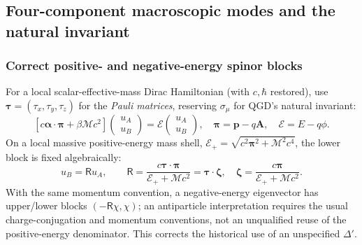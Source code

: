 \documentclass[11pt,a4paper]{article}
\begin{document}
\subsection{Four-component macroscopic modes and the natural invariant}\label{sec:qgd-four-component}
\subsubsection{Correct positive- and negative-energy spinor blocks}
For a local scalar-effective-mass Dirac Hamiltonian (with $c,\hbar$ restored), use $\bm\tau=(\tau_x,\tau_y,\tau_z)$ for the \emph{Pauli matrices}, reserving $\sigma_\mu$ for QGD's natural invariant:
\begin{equation}\label{eq:qgd-hamiltonian-block}
\left[c\bm\alpha\cdot\bm\pi+\beta\mathcal Mc^2\right]
\begin{pmatrix}u_A\\u_B\end{pmatrix}
=\mathcal E\begin{pmatrix}u_A\\u_B\end{pmatrix},\quad
\bm\pi=\bm p-q\bm A,\quad
\mathcal E=E-q\phi.
\end{equation}
On a local massive positive-energy mass shell, $\mathcal E_+=\sqrt{c^2\bm\pi^2+\mathcal M^2c^4}$, the lower block is fixed algebraically:
\begin{equation}\label{eq:qgd-spinor-ratio}
 u_B=\mathsf R u_A,\qquad
 \boxed{\mathsf R=\frac{c\bm\tau\cdot\bm\pi}{\mathcal E_++\mathcal Mc^2}
 =\bm\tau\cdot\bm\zeta,\quad
 \bm\zeta=\frac{c\bm\pi}{\mathcal E_++\mathcal Mc^2}.}
\end{equation}
With the same momentum convention, a negative-energy eigenvector has upper/lower blocks $(-\mathsf R\chi,\chi)$; an antiparticle interpretation requires the usual charge-conjugation and momentum conventions, not an unqualified reuse of the positive-energy denominator. This corrects the historical use of an unspecified $\Delta'$.
\end{document}
